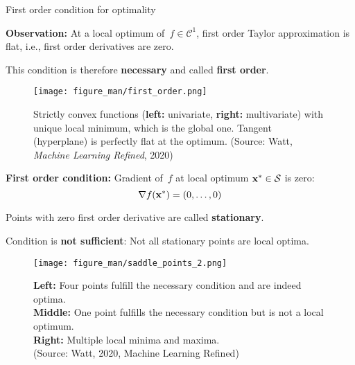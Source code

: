 \documentclass[11pt,compress,t,notes=noshow, xcolor=table]{beamer}
\begin{document}
\begin{vbframe}{First order condition for optimality}

\textbf{Observation:} At a local optimum of~$f\in\mathcal{C}^1$, first order Taylor approximation is flat, i.e., first order derivatives are zero.

\medskip

This condition is therefore \textbf{necessary} and called \textbf{first order}.

\begin{figure}
    \centering
    \texttt{[image: figure\_man/first\_order.png]}
    \caption*{\footnotesize
        Strictly convex functions (\textbf{left:} univariate, \textbf{right:} multivariate) with unique local minimum, which is the global one.
        Tangent (hyperplane) is perfectly flat at the optimum.
        (Source: Watt, \textit{Machine Learning Refined}, 2020)}
\end{figure}

\framebreak


\textbf{First order condition:}
Gradient of~$f$ at local optimum $\mathbf{x}^\ast \in \mathcal{S}$ is zero:
\vspace{-0.5\baselineskip}
\begin{equation*}
    \nabla f(\mathbf{x}^\ast) = (0,\ldots,0)
\end{equation*}


Points with zero first order derivative are called \textbf{stationary}.

\medskip

Condition is \textbf{not sufficient}: Not all stationary points are local optima.

\begin{figure}
    \centering
    \texttt{[image: figure\_man/saddle\_points\_2.png]}
    \captionsetup{justification=centering}
    \caption*{\footnotesize
        \textbf{Left:} Four points fulfill the necessary condition and are indeed optima. \\
        \textbf{Middle:} One point fulfills the necessary condition but is not a local optimum. \\
        \textbf{Right:} Multiple local minima and maxima. \\
        (Source: Watt, 2020, Machine Learning Refined)}
\end{figure}

\end{vbframe}
\end{document}
